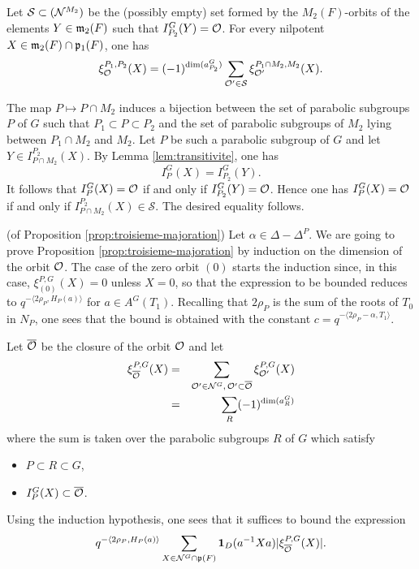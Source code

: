 \begin{paragr}
\begin{lemme}\label{lem:xi-induction}
  Let $\mathcal{S}\subset (\mathcal{N}^{M_2})$ be the (possibly empty) set formed by the $M_2(F)$-orbits of the elements $Y\in \mathfrak{m}_2(F)$ such that $I_{P_2}^G(Y)=\mathcal{O}$. For every nilpotent $X\in \mathfrak{m}_2(F)\cap \mathfrak{p}_1(F)$, one has
$$\xi_{\mathcal{O}}^{P_1,P_2}(X)=(-1)^{\dim(a_{P_2}^G)} \sum_{\mathcal{O}'\in \mathcal{S}} \xi_{\mathcal{O}'}^{P_1\cap M_2,M_2}(X).$$
\end{lemme}

\begin{preuve}
  The map $P\mapsto P\cap M_2$ induces a bijection between the set of parabolic subgroups $P$ of $G$ such that $P_1\subset P\subset P_2$ and the set of parabolic subgroups of $M_2$ lying between $P_1\cap M_2$ and $M_2$. Let $P$ be such a parabolic subgroup of $G$ and let $Y\in I_{P\cap M_2}^{P_2}(X)$. By Lemma \ref{lem:transitivite}, one has
$$I_P^G(X)=I_{P_2}^G(Y).$$
It follows that $I_P^G(X)=\mathcal{O}$ if and only if $I_{P_2}^G(Y)=\mathcal{O}$. Hence one has $I_P^G(X)=\mathcal{O}$ if and only if $I_{P\cap M_2}^{P_2}(X)\in \mathcal{S}$. The desired equality follows.
\end{preuve}

\begin{preuve}
  (of Proposition \ref{prop:troisieme-majoration}) Let $\alpha\in \Delta-\Delta^P$. We are going to prove Proposition \ref{prop:troisieme-majoration} by induction on the dimension of the orbit $\mathcal{O}$. The case of the zero orbit $(0)$ starts the induction since, in this case, $\xi_{(0)}^{P,G}(X)=0$ unless $X=0$, so that the expression to be bounded reduces to $q^{-\langle 2\rho_P,H_P(a)\rangle}$ for $a\in A^G(T_1)$. Recalling that $2\rho_P$ is the sum of the roots of $T_0$ in $N_P$, one sees that the bound is obtained with the constant $c=q^{-\langle 2\rho_P-\alpha,T_1\rangle}$.

Let $\overline{\mathcal{O}}$ be the closure of the orbit $\mathcal{O}$ and let
\begin{eqnarray*}
  \xi_{\overline{\mathcal{O}}}^{P,G}(X)&=&\sum_{\mathcal{O}'\in \mathcal{N}^G,\, \mathcal{O}'\subset \overline{\mathcal{O}}} \xi_{\mathcal{O}'}^{P,G}(X)\\
  &=&\sum_R (-1)^{\dim(a_R^G)}
\end{eqnarray*}
where the sum is taken over the parabolic subgroups $R$ of $G$ which satisfy
\begin{itemize}
\item $P\subset R\subset G$,
\item $I_P^G(X)\subset \overline{\mathcal{O}}$.
\end{itemize}
Using the induction hypothesis, one sees that it suffices to bound the expression
\begin{equation}
  \label{eq:expr-adherence}
  q^{-\langle 2\rho_P,H_P(a)\rangle} \sum_{X\in \mathcal{N}^G\cap \mathfrak{p}(F)} \mathbf{1}_D(a^{-1}Xa)|\xi_{\overline{\mathcal{O}}}^{P,G}(X)|.
\end{equation}


\end{preuve}
\end{paragr}

